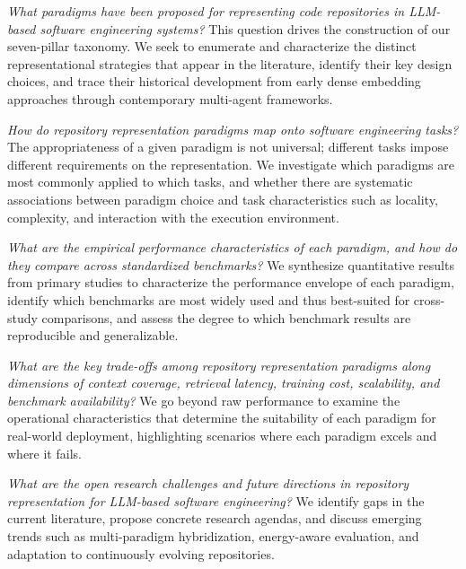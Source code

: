 \begin{description}[leftmargin=2.5em, labelwidth=2.5em]

\item[\textbf{\rqone}] \textit{What paradigms have been proposed for representing code
  repositories in LLM-based software engineering systems?} This question drives the
  construction of our seven-pillar taxonomy. We seek to enumerate and characterize the distinct
  representational strategies that appear in the literature, identify their key design choices,
  and trace their historical development from early dense embedding approaches through
  contemporary multi-agent frameworks.

\item[\textbf{\rqtwo}] \textit{How do repository representation paradigms map onto software
  engineering tasks?} The appropriateness of a given paradigm is not universal; different tasks
  impose different requirements on the representation. We investigate which paradigms are most
  commonly applied to which tasks, and whether there are systematic associations between paradigm
  choice and task characteristics such as locality, complexity, and interaction with the
  execution environment.

\item[\textbf{\rqthree}] \textit{What are the empirical performance characteristics of each
  paradigm, and how do they compare across standardized benchmarks?} We synthesize quantitative
  results from primary studies to characterize the performance envelope of each paradigm,
  identify which benchmarks are most widely used and thus best-suited for cross-study
  comparisons, and assess the degree to which benchmark results are reproducible and
  generalizable.

\item[\textbf{\rqfour}] \textit{What are the key trade-offs among repository representation
  paradigms along dimensions of context coverage, retrieval latency, training cost,
  scalability, and benchmark availability?} We go beyond raw performance to examine the
  operational characteristics that determine the suitability of each paradigm for real-world
  deployment, highlighting scenarios where each paradigm excels and where it fails.

\item[\textbf{\rqfive}] \textit{What are the open research challenges and future directions
  in repository representation for LLM-based software engineering?} We identify gaps in the
  current literature, propose concrete research agendas, and discuss emerging trends such as
  multi-paradigm hybridization, energy-aware evaluation, and adaptation to continuously evolving
  repositories.

\end{description}

